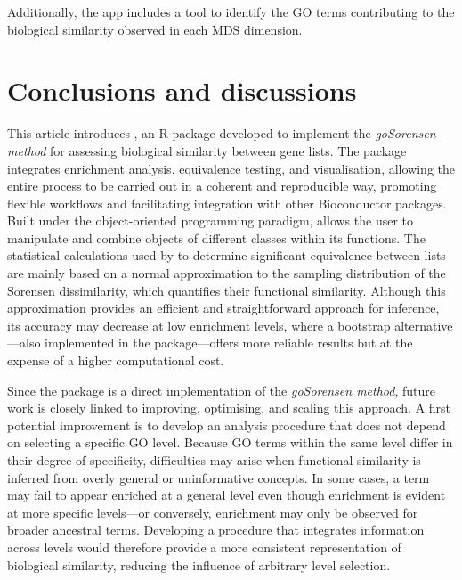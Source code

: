 Additionally, the app includes a tool to identify the GO terms contributing to the biological similarity observed in each MDS dimension.

\hypertarget{conclusions-and-discussions}{%
\section{Conclusions and discussions}\label{conclusions-and-discussions}}

This article introduces , an R package developed to implement the \emph{goSorensen method} for assessing biological similarity between gene lists. The package integrates enrichment analysis, equivalence testing, and visualisation, allowing the entire process to be carried out in a coherent and reproducible way, promoting flexible workflows and facilitating integration with other Bioconductor packages. Built under the object-oriented programming paradigm,  allows the user to manipulate and combine objects of different classes within its functions. The statistical calculations used by  to determine significant equivalence between lists are mainly based on a normal approximation to the sampling distribution of the Sorensen dissimilarity, which quantifies their functional similarity. Although this approximation provides an efficient and straightforward approach for inference, its accuracy may decrease at low enrichment levels, where a bootstrap alternative---also implemented in the package---offers more reliable results but at the expense of a higher computational cost.

Since the  package is a direct implementation of the \emph{goSorensen method}, future work is closely linked to improving, optimising, and scaling this approach. A first potential improvement is to develop an analysis procedure that does not depend on selecting a specific GO level. Because GO terms within the same level differ in their degree of specificity, difficulties may arise when functional similarity is inferred from overly general or uninformative concepts. In some cases, a term may fail to appear enriched at a general level even though enrichment is evident at more specific levels---or conversely, enrichment may only be observed for broader ancestral terms. Developing a procedure that integrates information across levels would therefore provide a more consistent representation of biological similarity, reducing the influence of arbitrary level selection.

